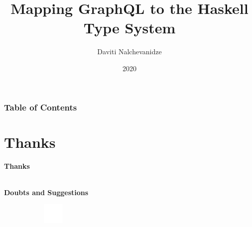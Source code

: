 \documentclass[aspectratio=169,t,xcolor=table]{beamer}
\begin{document}
\title[Inf UFG]{Mapping GraphQL to the Haskell Type System}

\author{Daviti Nalchevanidze}

\date{2020}
\frame[noframenumbering]{\titlepage}



\begin{frame}
    \frametitle{Table of Contents}
    \tableofcontents
\end{frame}





\section{Thanks}
\begin{frame}
    
    \centering
    \vspace{2cm}
    
    \textbf{\Huge Thanks}
    
    \ \\
    
    \textbf{Doubts and Suggestions}
    \ \\
    
    
    \vspace{2cm}
    \begin{figure}
        \centering
        \begin{subfigure}{0.2\textwidth}
            \centering
            \includegraphics[height=1cm]{assets/img/logo-white-outline.pdf}
        \end{subfigure}%
    \end{figure}
\end{frame}


\titlepage
\end{document}
